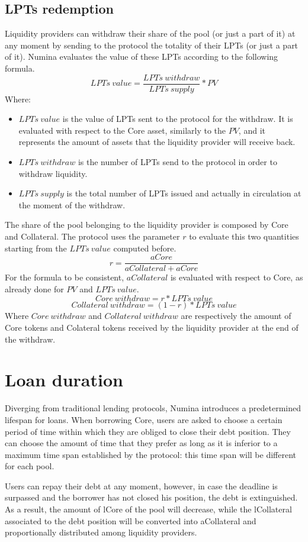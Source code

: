 \documentclass[12pt]{paper}
\begin{document}
	\subsection{LPTs redemption}
	\label{subsec:redemption}
	Liquidity providers can withdraw their share of the pool (or just a part of it) at any moment by sending to the protocol the totality of their LPTs (or just a part of it). Numina evaluates the value of these LPTs according to the following formula.
	\begin{equation}
		LPTs\ value = \frac{LPTs\ withdraw}{LPTs\ supply}*PV
	\end{equation}
	Where:
	\begin{itemize}
		\item $LPTs\ value$ is the value of LPTs sent to the protocol for the withdraw. It is evaluated with respect to the Core asset, similarly to the $PV$, and it represents the amount of assets that the liquidity provider will receive back.
		\item $LPTs\ withdraw$ is the number of LPTs send to the protocol in order to withdraw liquidity.
		\item $LPTs\ supply$ is the total number of LPTs issued and actually in circulation at the moment of the withdraw.
	\end{itemize}
	The share of the pool belonging to the liquidity provider is composed by Core and Collateral. The protocol uses the parameter $r$ to evaluate this two quantities starting from the $LPTs\ value$ computed before.
	\begin{equation}
		r = \frac{aCore}{aCollateral + aCore}
	\end{equation}
	For the formula to be consistent, $aCollateral$ is evaluated with respect to Core, as already done for $PV$ and $LPTs\ value$.
	\begin{equation}
		Core\ withdraw = r * LPTs\ value
	\end{equation}
	\begin{equation}
		Collateral\ withdraw = (1-r) * LPTs\ value
	\end{equation}
	Where $Core\ withdraw$ and $Collateral\ withdraw$ are respectively the amount of Core tokens and Colateral tokens received by the liquidity provider at the end of the withdraw.
\section{Loan duration}
\label{sec:duration}
	Diverging from traditional lending protocols, Numina introduces a predetermined lifespan for loans. When borrowing Core, users are asked to choose a certain period of time within which they are obliged to close their debt position. They can choose the amount of time that they prefer as long as it is inferior to a maximum time span established by the protocol: this time span will be different for each pool.
	\par Users can repay their debt at any moment, however, in case the deadline is surpassed and the borrower has not closed his position, the debt is extinguished. As a result, the amount of lCore of the pool will decrease, while the lCollateral associated to the debt position will be converted into aCollateral and proportionally distributed among liquidity providers.
	
\end{document}
